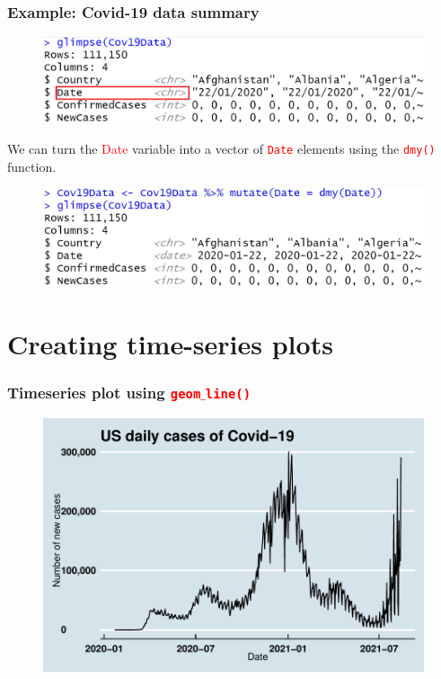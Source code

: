 \documentclass{beamer}
\begin{document}
\begin{frame}\frametitle{Example: Covid-19 data summary}
\begin{figure}
\includegraphics[width=0.99\linewidth]{PlotsLec4/Cov19DataSummary}
\end{figure}
We can turn the \textcolor{red}{Date} variable into a vector of \texttt{\textcolor{red}{Date}} elements using the \texttt{\textcolor{red}{dmy()}} function.
\begin{figure}
\includegraphics[width=0.99\linewidth]{PlotsLec4/Cov19DataSummary2}
\end{figure}
\end{frame}

\section{Creating time-series plots}
\begin{frame}\frametitle{Timeseries plot using \texttt{\textcolor{red}{geom$\_$line()}}}
\begin{figure}
\includegraphics[width=0.99\linewidth]{PlotsLec4/covidUSA_baseplt}
\end{figure}
\end{frame}
\end{document}
